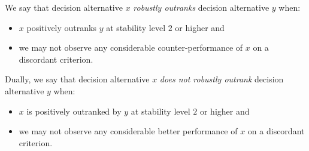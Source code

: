 We say that decision alternative $x$ \emph{robustly outranks} decision alternative $y$ when:
\begin{itemize}
\item $x$ positively outranks $y$ at stability level $2$ or higher and
\item we may not observe any considerable counter-performance of $x$ on a discordant criterion.
\end{itemize}
Dually, we say that decision alternative $x$ \emph{does not robustly outrank} decision alternative $y$ when:
\begin{itemize}
\item $x$ is positively outranked by $y$ at stability level $2$ or higher and
\item we may not observe any considerable better performance of $x$ on a discordant criterion.
\end{itemize}     

